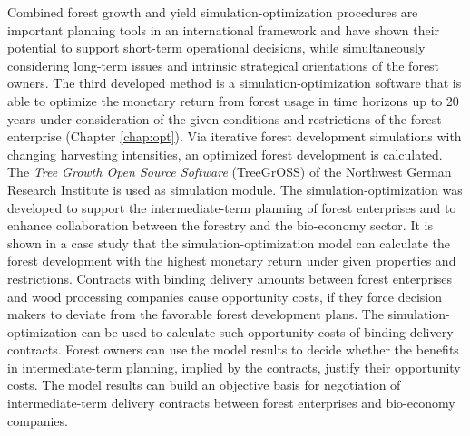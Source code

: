 Combined forest growth and yield si\-mu\-la\-tion-op\-ti\-mi\-za\-tion procedures are important planning tools in an international framework and have shown their potential to support short-term operational decisions, while simultaneously considering long-term issues and intrinsic strategical orientations of the forest owners. The third developed method is a si\-mu\-la\-tion-op\-ti\-mi\-za\-tion software that is able to optimize the monetary return from forest usage in time horizons up to 20 years under consideration of the given conditions and restrictions of the forest enterprise (Chapter \ref{chap:opt}). Via iterative forest development simulations with changing harvesting intensities, an optimized forest development is calculated. The \textit{Tree Growth Open Source Software} (TreeGrOSS) of the Northwest German Research Institute is used as simulation module. The si\-mu\-la\-tion-op\-ti\-mi\-za\-tion was developed to support the intermediate-term planning of forest enterprises and to enhance collaboration between the forestry and the bio-economy sector. It is shown in a case study that the si\-mu\-la\-tion-op\-ti\-mi\-za\-tion model can calculate the forest development with the highest monetary return under given properties and restrictions. Contracts with binding delivery amounts between forest enterprises and wood processing companies cause opportunity costs, if they force decision makers to deviate from the favorable forest development plans. The si\-mu\-la\-tion-op\-ti\-mi\-za\-tion can be used to calculate such opportunity costs of binding delivery contracts. Forest owners can use the model results to decide whether the benefits in intermediate-term planning, implied by the contracts, justify their opportunity costs. The model results can build an objective basis for negotiation of intermediate-term delivery contracts between forest enterprises and bio-economy companies.